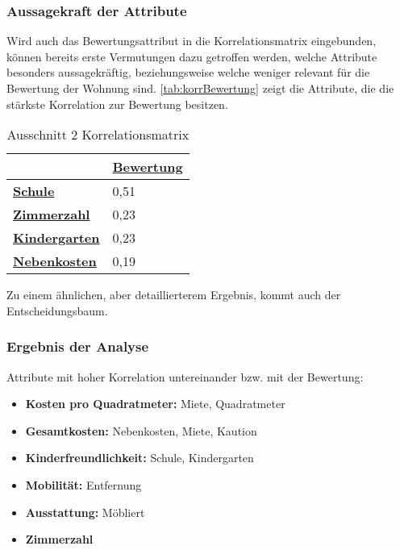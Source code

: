 \subsubsection{Aussagekraft der Attribute}
Wird auch das Bewertungsattribut in die Korrelationsmatrix eingebunden, können bereits erste Vermutungen dazu getroffen werden, 
welche Attribute besonders aussagekräftig, beziehungsweise welche weniger relevant für die Bewertung der Wohnung sind. 
\autoref{tab:korrBewertung} zeigt die Attribute, die die stärkste Korrelation zur Bewertung besitzen.
\useunder{\uline}{\ul}{}
\begin{table}[h]
    \begin{center}
        \begin{tabular}{|l|l|}
            \hline
            {\ul \textbf{}}              & {\ul \textbf{Bewertung}} \\ \hline
            {\ul \textbf{Schule}}        & 0,51                        \\ \hline
            {\ul \textbf{Zimmerzahl}}    & 0,23                     \\ \hline
            {\ul \textbf{Kindergarten}}  & 0,23                     \\ \hline
            {\ul \textbf{Nebenkosten}}   & 0,19                     \\ \hline
        \end{tabular}
        \caption{Ausschnitt 2 Korrelationsmatrix}
        \label{tab:korrBewertung}
    \end{center}
\end{table}
Zu einem ähnlichen, aber detaillierterem Ergebnis, kommt auch der Entscheidungsbaum. 

\subsubsection{Ergebnis der Analyse}
Attribute mit hoher Korrelation untereinander bzw. mit der Bewertung:
\begin{itemize}
    \item \textbf{Kosten pro Quadratmeter:} Miete, Quadratmeter
    \item \textbf{Gesamtkosten:} Nebenkosten, Miete, Kaution
    \item \textbf{Kinderfreundlichkeit:} Schule, Kindergarten
    \item \textbf{Mobilität:} Entfernung
    \item \textbf{Ausstattung:} Möbliert
    \item \textbf{Zimmerzahl}
\end{itemize}

